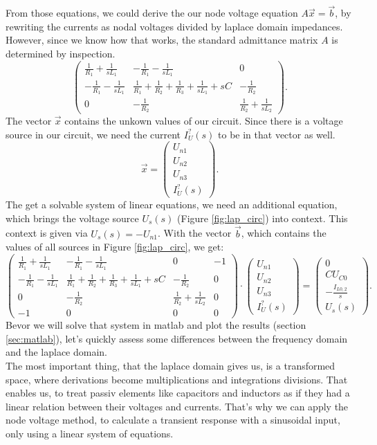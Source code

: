 \documentclass[a4paper]{article}
\begin{document}
From those equations, we could derive the our node voltage equation $A\vec{x} = \vec{b}$, by 
rewriting the currents as nodal voltages divided by laplace domain impedances.
However, since we know how that works, the standard admittance matrix $A$ is determined by
inspection. 
\[
  \begin{pmatrix}
    \frac{1}{R_1} + \frac{1}{sL_1} & -\frac{1}{R_1} - \frac{1}{sL_1} & 0 \\
    -\frac{1}{R_1} - \frac{1}{sL_1} & \frac{1}{R_1} + \frac{1}{R_2} + \frac{1}{R_3} + 
    \frac{1}{sL_1} + sC & -\frac{1}{R_2} \\ 
    0 & -\frac{1}{R_2} & \frac{1}{R_2} + \frac{1}{sL_2}
  \end{pmatrix}
.\] 
The vector $\vec{x}$ contains the unkown values of our circuit. Since there is a voltage source in
our circuit, we need the current  $I_{U}^{?}(s)$ to be in that vector as well.
\[
  \vec{x} =
  \begin{pmatrix}
    U_{n1} \\ U_{n2} \\ U_{n3} \\ I_{U}^{?}(s) 
  \end{pmatrix}
.\] 
The get a solvable system of linear equations, we need an additional equation, which brings the
voltage source $U_s(s)$ (Figure \ref{fig:lap_circ}) into context. This context is given via 
$U_s(s) = -U_{n1}$. With the vector $\vec{b}$, which contains the values of all sources in Figure
\ref{fig:lap_circ}, we get:
\[
  \begin{pmatrix}
    \frac{1}{R_1} + \frac{1}{sL_1} & -\frac{1}{R_1} - \frac{1}{sL_1} & 0 & -1\\
    -\frac{1}{R_1} - \frac{1}{sL_1} & \frac{1}{R_1} + \frac{1}{R_2} + \frac{1}{R_3} + 
    \frac{1}{sL_1} + sC & -\frac{1}{R_2} & 0\\ 
    0 & -\frac{1}{R_2} & \frac{1}{R_2} + \frac{1}{sL_2} & 0 \\
    -1 & 0 & 0 & 0
  \end{pmatrix} \cdot
  \begin{pmatrix}
    U_{n1} \\ U_{n2} \\ U_{n3} \\ I_{U}^{?}(s)  
  \end{pmatrix} =
  \begin{pmatrix}
    0 \\ CU_{C0} \\ - \frac{I_{L0,2}}{s} \\ U_s(s)
  \end{pmatrix}
.\] \clearpage
Bevor we will solve that system in matlab and plot the results (section \ref{sec:matlab}), 
let's quickly assess some differences between the frequency domain and the laplace domain.
\bigskip
\\The most important thing, that the laplace domain gives us, is a transformed space, where
derivations become multiplications and integrations divisions. That enables us, to treat passiv
elements like capacitors and inductors as if they had a linear relation between their voltages and
currents. That's why we can apply the node voltage method, to calculate a transient response with a 
sinusoidal input, only using a linear system of equations.
\end{document}
